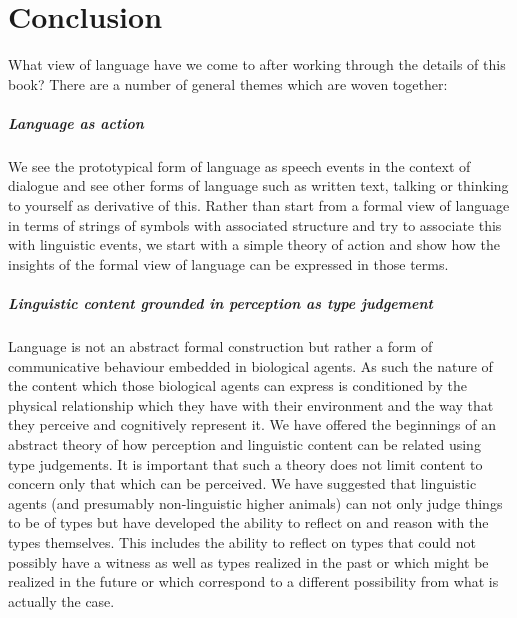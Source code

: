 \chapter*{Conclusion}
\label{ch:conclusion}


What view of language have we come to after working through the
details of this book?
There are a number of general themes which are woven together:

\paragraph{Language as action} We see the prototypical form of
language as speech events in the context of dialogue and see other
forms of language such as written text, talking or thinking to
yourself as derivative of this.  Rather than start from a formal view
of language in terms of strings of symbols with associated structure
and try to associate this with linguistic events, we start with a
simple theory of action and show how the insights of the formal view
of language can be expressed in those terms.
 
\paragraph{Linguistic content grounded in perception as type
  judgement}  Language is not an abstract formal construction but
rather a form of communicative behaviour embedded in biological
agents.  As such the nature of the content which those biological
agents can express is conditioned by the physical relationship which
they have with their environment and the way that they
perceive and cognitively represent it.  We have offered
the beginnings of an abstract theory of how perception and linguistic
content can be related using type judgements.  It is important that
such a theory does not limit content to concern only that which can be
perceived.  We have suggested that linguistic agents (and presumably
non-linguistic higher animals) can not only judge things to be of
types but have developed the ability to reflect on and reason with the types themselves.  This
includes the ability to reflect on types that could not possibly have
a witness as well as types realized in the past or which might be
realized in the future or which correspond to a different possibility
from what is actually the case.


